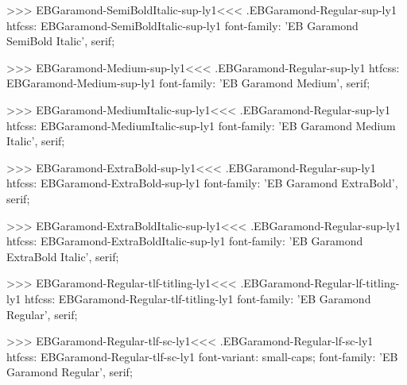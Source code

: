 {{>>>
\<EBGaramond-SemiBoldItalic-sup-ly1\><<<
.EBGaramond-Regular-sup-ly1
htfcss:  EBGaramond-SemiBoldItalic-sup-ly1  font-family: 'EB Garamond SemiBold Italic', serif;

>>>
\<EBGaramond-Medium-sup-ly1\><<<
.EBGaramond-Regular-sup-ly1
htfcss:  EBGaramond-Medium-sup-ly1  font-family: 'EB Garamond Medium', serif;

>>>
\<EBGaramond-MediumItalic-sup-ly1\><<<
.EBGaramond-Regular-sup-ly1
htfcss:  EBGaramond-MediumItalic-sup-ly1  font-family: 'EB Garamond Medium Italic', serif;

>>>
\<EBGaramond-ExtraBold-sup-ly1\><<<
.EBGaramond-Regular-sup-ly1
htfcss:  EBGaramond-ExtraBold-sup-ly1  font-family: 'EB Garamond ExtraBold', serif;

>>>
\<EBGaramond-ExtraBoldItalic-sup-ly1\><<<
.EBGaramond-Regular-sup-ly1
htfcss:  EBGaramond-ExtraBoldItalic-sup-ly1  font-family: 'EB Garamond ExtraBold Italic', serif;

>>>
\<EBGaramond-Regular-tlf-titling-ly1\><<<
.EBGaramond-Regular-lf-titling-ly1
htfcss:  EBGaramond-Regular-tlf-titling-ly1  font-family: 'EB Garamond Regular', serif;

>>>
\<EBGaramond-Regular-tlf-sc-ly1\><<<
.EBGaramond-Regular-lf-sc-ly1
htfcss:  EBGaramond-Regular-tlf-sc-ly1  font-variant: small-caps; font-family: 'EB Garamond Regular', serif;

}}
